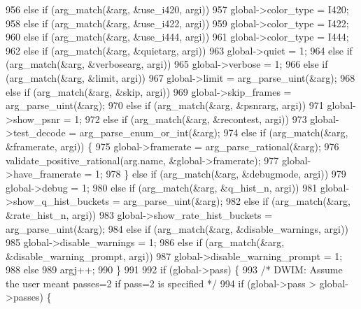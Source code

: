 \begin{DoxyCodeInclude}
{{{{{{{{{{{{{{956     \textcolor{keywordflow}{else} \textcolor{keywordflow}{if} (arg\_match(&arg, &use\_i420, argi))
957       global->color\_type = I420;
958     \textcolor{keywordflow}{else} \textcolor{keywordflow}{if} (arg\_match(&arg, &use\_i422, argi))
959       global->color\_type = I422;
960     \textcolor{keywordflow}{else} \textcolor{keywordflow}{if} (arg\_match(&arg, &use\_i444, argi))
961       global->color\_type = I444;
962     \textcolor{keywordflow}{else} \textcolor{keywordflow}{if} (arg\_match(&arg, &quietarg, argi))
963       global->quiet = 1;
964     \textcolor{keywordflow}{else} \textcolor{keywordflow}{if} (arg\_match(&arg, &verbosearg, argi))
965       global->verbose = 1;
966     \textcolor{keywordflow}{else} \textcolor{keywordflow}{if} (arg\_match(&arg, &limit, argi))
967       global->limit = arg\_parse\_uint(&arg);
968     \textcolor{keywordflow}{else} \textcolor{keywordflow}{if} (arg\_match(&arg, &skip, argi))
969       global->skip\_frames = arg\_parse\_uint(&arg);
970     \textcolor{keywordflow}{else} \textcolor{keywordflow}{if} (arg\_match(&arg, &psnrarg, argi))
971       global->show\_psnr = 1;
972     \textcolor{keywordflow}{else} \textcolor{keywordflow}{if} (arg\_match(&arg, &recontest, argi))
973       global->test\_decode = arg\_parse\_enum\_or\_int(&arg);
974     \textcolor{keywordflow}{else} \textcolor{keywordflow}{if} (arg\_match(&arg, &framerate, argi)) \{
975       global->framerate = arg\_parse\_rational(&arg);
976       validate\_positive\_rational(arg.name, &global->framerate);
977       global->have\_framerate = 1;
978     \} \textcolor{keywordflow}{else} \textcolor{keywordflow}{if} (arg\_match(&arg, &debugmode, argi))
979       global->debug = 1;
980     \textcolor{keywordflow}{else} \textcolor{keywordflow}{if} (arg\_match(&arg, &q\_hist\_n, argi))
981       global->show\_q\_hist\_buckets = arg\_parse\_uint(&arg);
982     \textcolor{keywordflow}{else} \textcolor{keywordflow}{if} (arg\_match(&arg, &rate\_hist\_n, argi))
983       global->show\_rate\_hist\_buckets = arg\_parse\_uint(&arg);
984     \textcolor{keywordflow}{else} \textcolor{keywordflow}{if} (arg\_match(&arg, &disable\_warnings, argi))
985       global->disable\_warnings = 1;
986     \textcolor{keywordflow}{else} \textcolor{keywordflow}{if} (arg\_match(&arg, &disable\_warning\_prompt, argi))
987       global->disable\_warning\_prompt = 1;
988     \textcolor{keywordflow}{else}
989       argj++;
990   \}
991 
992   \textcolor{keywordflow}{if} (global->pass) \{
993     \textcolor{comment}{/* DWIM: Assume the user meant passes=2 if pass=2 is specified */}
994     \textcolor{keywordflow}{if} (global->pass > global->passes) \{
}}}}}}}}}}}}}}
\end{DoxyCodeInclude}
